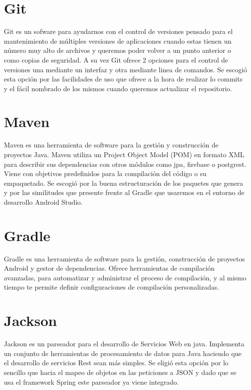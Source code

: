 \section{Git}
Git es un sofware para ayudarnos con el control de versiones  pensado para el mantenimiento de múltiples versiones de aplicaciones cuando estas tienen un número muy alto de archivos y queremos poder volver a un punto anterior o como copias de seguridad. A su vez Git ofrece 2 opciones para el control de versiones una mediante un interfaz y otra mediante linea de comandos. Se escogió esta opción por las facilidades de uso que ofrece a la hora de realizar lo commits y el fácil nombrado de los mismos cuando queremos actualizar el repositorio.
\section{Maven}
Maven es una herramienta de software para la gestión y construcción de proyectos Java.
 Maven utiliza un Project Object Model (POM) en formato
XML para describir sus dependencias con otros módulos como jpa, firebase o postgrest. Viene con objetivos predefinidos para la compilación del código o su empaquetado. Se escogió por la buena estructuración de los paquetes que genera y por las similitudes que presente frente al Gradle que usaremos en el entorno de desarrollo Android Studio.




\section{Gradle}
Gradle es una herramienta de software para la gestión, construcción de proyectos Android y gestor de dependencias. Ofrece
  herramientas de compilación avanzadas, para automatizar y administrar el proceso de compilación, y al mismo tiempo te permite definir configuraciones de compilación personalizadas.



\section{Jackson}

Jackson es un parseador para el desarrollo de Servicios Web en java. Implementa un conjunto de   herramientas de procesamiento de datos para Java haciendo que el desarrollo de servicios Rest sean más simples. Se eligió esta opción por lo sencillo que hacia el mapeo de objetos en las peticiones a JSON y dado que se usa el framework Spring este parseador ya viene integrado.








